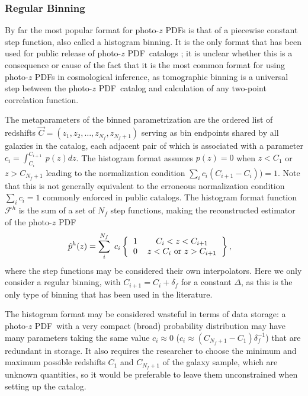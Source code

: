 \documentclass[\docopts]{\docclass}
\newcommand{\pz}{photo-$z$ PDF}
\begin{document}
\subsubsection{Regular Binning}
\label{sec:bins}

By far the most popular format for \pz s is that of a piecewise constant step
function, also called a histogram binning.  It is the only format that has been
used for public release of \pz\ catalogs \citep{tanaka_photometric_2017,
sheldon_photometric_2012}; it is unclear whether this is a consequence or cause
of the fact that it is the most common format for using \pz s in cosmological
inference, as tomographic binning is a universal step between the \pz\ catalog
and calculation of any two-point correlation function.

The metaparameters of the binned parametrization are the ordered list of
redshifts $\vec{C} = (z_{1}, z_{2}, \dots, z_{N_{f}}, z_{N_{f}+1})$ serving as
bin endpoints shared by all galaxies in the catalog, each adjacent pair of
which is associated with a parameter $c_{i}=\int_{C_{i}}^{C_{i+1}}\ p(z)dz$.
The histogram format assumes $p(z)=0$ when $z<C_{1}$ or $z>C_{N_{f}+1}$ leading
to the normalization condition $\sum_{i} c_{i}(C_{i+1}-C_{i})) = 1$.  Note that
this is not generally equivalent to the erroneous normalization condition
$\sum_{i} c_{i} = 1$ commonly enforced in public catalogs.  The histogram
format function $\mathcal{F}^{h}$ is the sum of a set of $N_{f}$ step
functions, making the reconstructed estimator of the \pz
\begin{align}
  \label{eq:binned}
  \hat{p}^{h}(z) &= \sum_{i}^{N_{f}}\ c_{i}
\left\{\begin{tabular}{cc}$1$&$C_{i}<z<C_{i+1}$\\
0&$z < C_{i}$\ or\ $z > C_{i+1}$\end{tabular}\right\},
\end{align}
where the step functions may be considered their own interpolators.  Here we
only consider a regular binning, with $C_{i+1}=C_{i}+\delta_{f}$ for a constant
$\Delta$, as this is the only type of binning that has been used in the
literature.

The histogram format may be considered wasteful in terms of data storage: a
\pz\ with a very compact (broad) probability distribution may have many
parameters taking the same value $c_{i}\approx0$
($c_{i}\approx(C_{N_{f}+1}-C_{1})\delta_{f}^{-1}$) that are redundant in
storage.  It also requires the researcher to choose the minimum and maximum
possible redshifts $C_{1}$ and $C_{N_{f}+1}$ of the galaxy sample, which are
unknown quantities, so it would be preferable to leave them unconstrained when
setting up the catalog.
\end{document}
